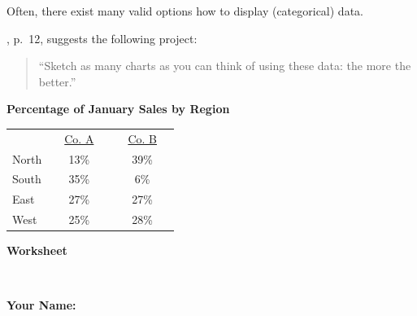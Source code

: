 \documentclass[12pt,letterpaper,final]{article}
\begin{document}
Often, there exist many valid options how to display (categorical) data.

\cite{Ze2001}, p.~12, suggests the following project:
\begin{quotation}
``Sketch as many charts as you can think of using these data:
the more the better.''
\end{quotation}

\begin{center}
{\bf Percentage of January Sales by Region} \\[0.2cm]
\begin{tabular}{lcc}
 & ~~\underline{Co. A}~~ & ~~\underline{Co. B}~~ \\
North & 13\% & 39\% \\
South & 35\% &  6\% \\
East  & 27\% & 27\% \\
West  & 25\% & 28\% \\
\end{tabular}
\end{center}



\newpage


\centerline{\Large \bf Worksheet}~\\

\centerline{\hfill {\large \bf Your Name:} \underline{\hspace*{5cm}}}

~\\[1cm]

\fbox{\rule[-0.2in]{0in}{2in}\hspace*{3in}} ~~ \fbox{\rule[-0.2in]{0in}{2in}\hspace*{3in}} \\

\fbox{\rule[-0.2in]{0in}{2in}\hspace*{3in}} ~~ \fbox{\rule[-0.2in]{0in}{2in}\hspace*{3in}} \\

\fbox{\rule[-0.2in]{0in}{2in}\hspace*{3in}} ~~ \fbox{\rule[-0.2in]{0in}{2in}\hspace*{3in}} \\


\end{document}
